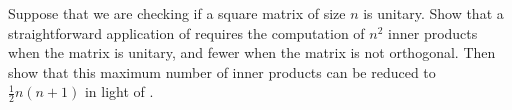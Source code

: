 Suppose that we are checking if a square matrix of size $n$ is unitary.  Show that a straightforward application of  requires the computation of $n^2$ inner products when the matrix is unitary, and fewer when the matrix is not orthogonal.  Then show that this maximum number of inner products can be reduced to $\frac{1}{2}n(n+1)$ in light of .